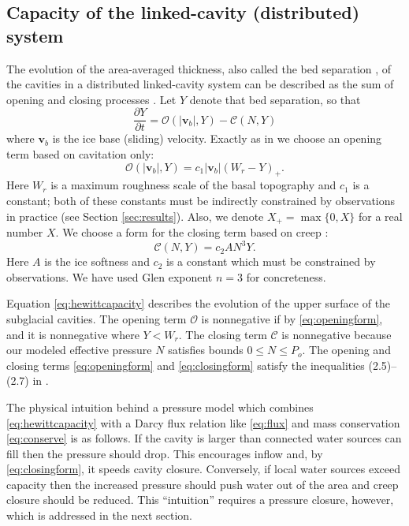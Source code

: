 \documentclass[11pt,final]{amsart}
\newcommand\bv{\mathbf{v}}
\begin{document}
\subsection*{Capacity of the linked-cavity (distributed) system}  The evolution of the area-averaged thickness, also called the bed separation \citep{Bartholomausetal2011}, of the cavities in a distributed linked-cavity system can be described as the sum of opening and closing processes \citep{Hewitt2011}.  Let $Y$ denote that bed separation, so that
\begin{equation}
\frac{\partial Y}{\partial t} = \mathcal{O}(|\bv_b|,Y) - \mathcal{C}(N,Y) \label{eq:hewittcapacity}
\end{equation}
where $\bv_b$ is the ice base (sliding) velocity.  Exactly as in \cite{Schoofetal2012} we choose an opening term based on cavitation only:
\begin{equation}
 \mathcal{O}(|\bv_b|,Y) = c_1 |\bv_b| (W_r - Y)_+. \label{eq:openingform}
\end{equation}
Here $W_r$ is a maximum roughness scale of the basal topography and $c_1$ is a constant; both of these constants must be indirectly constrained by observations in practice (see Section \ref{sec:results}).  Also, we denote $X_+= \max\{0,X\}$ for a real number $X$.  We choose a form for the closing term based on creep \citep{Hewitt2011,Schoofetal2012}:
\begin{equation}
\mathcal{C}(N,Y) = c_2 A N^3 Y. \label{eq:closingform}
\end{equation}
Here $A$ is the ice softness and $c_2$ is a constant which must be constrained by observations.  We have used Glen exponent $n=3$ for concreteness.

Equation \eqref{eq:hewittcapacity} describes the evolution of the upper surface of the subglacial cavities.  The opening term $\mathcal{O}$ is nonnegative if by \eqref{eq:openingform}, and it is nonnegative where $Y<W_r$.  The closing term $\mathcal{C}$ is nonnegative because our modeled effective pressure $N$ satisfies bounds $0\le N \le P_o$.  The opening and closing terms \eqref{eq:openingform} and \eqref{eq:closingform} satisfy the inequalities (2.5)--(2.7) in \cite{Schoofetal2012}.

The physical intuition behind a pressure model which combines \eqref{eq:hewittcapacity} with a Darcy flux relation like \eqref{eq:flux} and mass conservation \eqref{eq:conserve} is as follows.  If the cavity is larger than connected water sources can fill then the pressure should drop.  This encourages inflow and, by \eqref{eq:closingform}, it speeds cavity closure.  Conversely, if local water sources exceed capacity then the increased pressure should push water out of the area and creep closure should be reduced.  This ``intuition'' requires a pressure closure, however, which is addressed in the next section.
\end{document}
